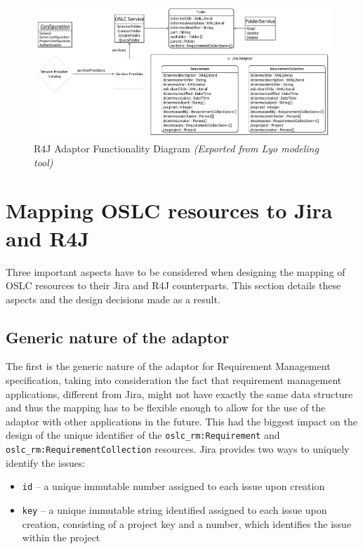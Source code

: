 \begin{figure}[H]
  \centering
  \begin{sideways}
    \includegraphics[width=1.4\linewidth]{figures/R4JInterfaceDiagram.jpg}
  \end{sideways}
  \caption{R4J Adaptor Functionality Diagram \emph{(Exported from Lyo modeling tool)}}
  \label{fig:r4j_adaptor_functionality_diagram}
\end{figure}

\section{Mapping OSLC resources to Jira and R4J}
Three important aspects have to be considered when designing the mapping of OSLC resources to their Jira and R4J counterparts. This section details these aspects and the design decisions made as a result.

\subsection*{Generic nature of the adaptor}
The first is the generic nature of the adaptor for Requirement Management specification, taking into consideration the fact that requirement management applications, different from Jira, might not have exactly the same data structure and thus the mapping has to be flexible enough to allow for the use of the adaptor with other applications in the future. This had the biggest impact on the design of the unique identifier of the \texttt{oslc\_rm:Requirement} and \texttt{oslc\_rm:RequirementCollection} resources. Jira provides two ways to uniquely identify the issues:

\begin{itemize}
  \item \texttt{id} -- a unique immutable number assigned to each issue upon creation
  \item \texttt{key} -- a unique immutable string identified assigned to each issue upon creation, consisting of a project key and a number, which identifies the issue within the project
\end{itemize}

